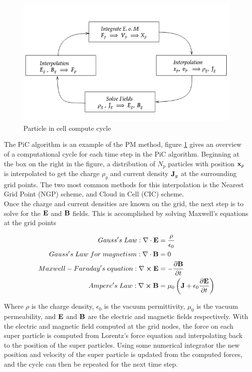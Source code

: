 \begin{figure}[h!]
    \centering
    \includegraphics[scale=0.6]{figures/PiC.png}
    \caption{Particle in cell compute cycle}
    \label{fig:pic}
\end{figure}

The PiC algorithm is an example of the PM method, figure \ref{fig:pic} gives an overview of a computational cycle for each time step in the PiC algorithm. Beginning at the box on the right in the figure, a distribution of $N_p$ particles with position $\vb{x}_p$ is interpolated to get the charge $\rho_g$ and current density $\vb{J}_g$ at the surrounding grid points. The two most common methods for this interpolation is the Nearest Grid Point (NGP) scheme, and Cloud in Cell (CIC) scheme.\\
Once the charge and current densities are known on the grid, the next step is to solve for the $\vb{E}$ and $\vb{B}$ fields. This is accomplished by solving Maxwell's equations at the grid points

\begin{subequations}
    \begin{align}
        Gauss's\; Law: \nabla \cdot \vb{E} &= \frac{\rho}{\epsilon_0} \label{eq:gauss} \\
        Gauss's\; Law\; for\; magnetism: \nabla \cdot \vb{B} &= 0 \\
        Maxwell - Faraday's\; equation: \nabla \cross \vb{E} &= - \pdv{\vb{B}}{t}\\
        Ampere's\; Law: \nabla \cross \vb{B} &= \mu_0 \left(\vb{J} + \epsilon_0 \pdv{\vb{E}}{t} \right)
    \end{align}
\end{subequations}

Where $\rho$ is the charge density, $\epsilon_0$ is the vacuum permittivity, $\mu_0$ is the vacuum permeability, and $\vb{E}$ and $\vb{B}$ are the electric and magnetic fields respectively. With the electric and magnetic field computed at the grid nodes, the force on each super particle is computed from Lorentz's force equation and interpolating back to the position of the super particles. Using some numerical integrator the new position and velocity of the super particle is updated from the computed forces, and the cycle can then be repeated for the next time step. 

